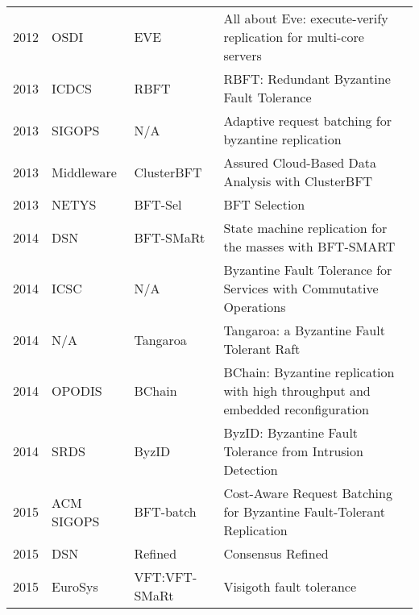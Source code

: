 \documentclass{article}
\begin{document}
\begin{landscape}
\begin{longtable}[c]{llll}
2012 & OSDI            & EVE          & All about Eve: execute-verify replication for multi-core servers \cite{Kapritsos:2012:EER:2387880.2387903}
                                                            \\
2013 & ICDCS             & RBFT           & RBFT: Redundant Byzantine Fault Tolerance    \cite{reabundant}                                             \\
2013 & SIGOPS              &   N/A        & Adaptive request batching for byzantine replication \cite{deSa:2013:ARB:2433140.2433149}                                             \\
2013 & Middleware        & ClusterBFT     & Assured Cloud-Based Data Analysis with ClusterBFT   \cite{assuredinproceedings}                                      \\
2013 & NETYS             & BFT-Sel        & BFT Selection                                                   \cite{Shoker:2013:BS:2958623.2958643}                           \\
2014 & DSN               & BFT-SMaRt      & State machine replication for the masses with BFT-SMART    \cite{Bessani:2014:SMR:2671853.2672428}                               \\
2014 & ICSC              & N/A            & Byzantine Fault Tolerance for Services with Commutative Operations    \cite{Chai:2014:BFT:2680847.2681538}                     \\
2014 & N/A               & Tangaroa       & Tangaroa: a Byzantine Fault Tolerant Raft   \cite{Copeland2014TangaroaA}                                               \\
2014 & OPODIS            & BChain         & BChain: Byzantine replication with high throughput and embedded reconfiguration  \cite{10.1007/978-3-319-14472-6_7}           \\
2014 & SRDS              & ByzID          & ByzID: Byzantine Fault Tolerance from Intrusion Detection \cite{Duan:2014:BBF:2707675.2707823}                                \\
2015 & ACM SIGOPS        & BFT-batch      & Cost-Aware Request Batching for Byzantine Fault-Tolerant Replication                                        \\
2015 & DSN               & Refined        & Consensus Refined    \cite{7266867}                                                                      \\
2015 & EuroSys           & VFT:VFT-SMaRt  & Visigoth fault tolerance     \cite{Porto:2015:VFT:2741948.2741979}                                                               \\

\end{longtable}
\end{landscape}
\end{document}
